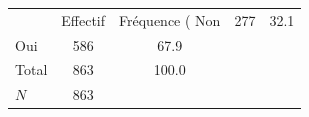 {
\def\sym#1{\ifmmode^{#1}\else\(^{#1}\)\fi}
\begin{tabular}{l*{1}{cc}}
\toprule
            &    Effectif&Fréquence (%
\midrule
Non         &         277&        32.1\\
Oui         &         586&        67.9\\
Total       &         863&       100.0\\
\midrule
\(N\)       &         863&            \\
\bottomrule
\end{tabular}
}
